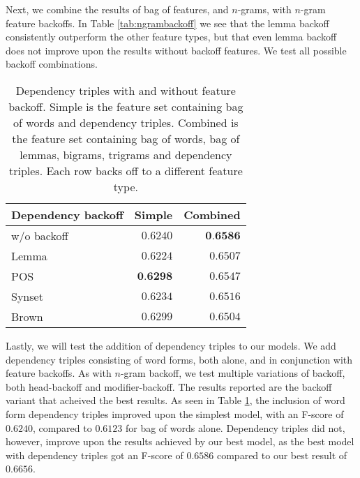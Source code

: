 \documentclass[11pt,letterpaper]{article}
\begin{document}
Next, we combine the results of bag of features, and $n$-grams, with $n$-gram feature backoffs. In Table \ref{tab:ngrambackoff} we see that the lemma backoff consistently outperform the other feature types, but that even lemma backoff does not improve upon the results without backoff features. We test all possible backoff combinations.

\begin{table}
  \begin{center}
    \begin{tabular}{lrr}
      \toprule
      
      
      Dependency backoff & Simple & Combined\\
      \midrule
      w/o backoff & $0.6240$ & $\textbf{0.6586}$ \\
      Lemma & $0.6224$ & $0.6507$ \\
      POS & $\textbf{0.6298}$ & $0.6547$ \\ %
      Synset & $0.6234$ & $0.6516$  \\ %
      Brown & $0.6299$ & $0.6504$ \\ %
      
      
      
      \bottomrule

    \end{tabular}
  \end{center}
  \caption{Dependency triples with and without feature backoff. Simple is the feature set containing bag of words and dependency triples. Combined is the feature set containing bag of words, bag of lemmas, bigrams, trigrams and dependency triples. Each row backs off to a different feature type.}
  \label{tab:depbackoff}
\end{table}

Lastly, we will test the addition of dependency triples to our models. We add dependency triples consisting of word forms, both alone, and in conjunction with feature backoffs. As with $n$-gram backoff, we test multiple variations of backoff, both head-backoff and modifier-backoff. The results reported are the backoff variant that acheived the best results. As seen in Table \ref{tab:depbackoff}, the inclusion of word form dependency triples improved upon the simplest model, with an F-score of $0.6240$, compared to $0.6123$ for bag of words alone. Dependency triples did not, however, improve upon the results achieved by our best model, as the best model with dependency triples got an F-score of $0.6586$ compared to our best result of $0.6656$.
\end{document}

